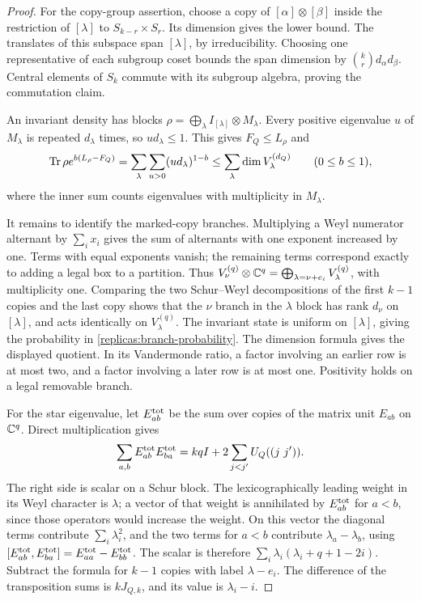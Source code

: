 \begin{proof}
For the copy-group assertion, choose a copy of
$[\alpha]\otimes[\beta]$ inside the restriction of $[\lambda]$ to
$S_{k-r}\times S_r$.  Its dimension gives the lower bound.
The translates of this subspace span $[\lambda]$, by irreducibility.
Choosing one representative of each subgroup coset bounds the span
dimension by $\binom{k}{r}d_\alpha d_\beta$.  Central elements of
$S_k$ commute with its subgroup algebra, proving the commutation claim.

An invariant density has blocks
$\rho=\bigoplus_\lambda I_{[\lambda]}\otimes M_\lambda$.
Every positive eigenvalue $u$ of $M_\lambda$ is repeated $d_\lambda$
times, so $u d_\lambda\le1$.  This gives $F_Q\le L_\rho$ and
\[
 \operatorname{Tr}\rho e^{b(L_\rho-F_Q)}
 =\sum_{\lambda}\sum_{u>0}(u d_\lambda)^{1-b}
 \le\sum_\lambda\dim V^{(d_Q)}_\lambda
 \qquad(0\le b\le1),
\]
where the inner sum counts eigenvalues with multiplicity in
$M_\lambda$.

It remains to identify the marked-copy branches.  Multiplying a Weyl
numerator alternant by $\sum_i x_i$ gives the sum of alternants with
one exponent increased by one.  Terms with equal exponents vanish;
the remaining terms correspond exactly to adding a legal box to a
partition.  Thus
$V^{(q)}_\nu\otimes\mathbb C^q=\bigoplus_{\lambda=\nu+e_i}
V^{(q)}_\lambda$, with multiplicity one.  Comparing the two
Schur--Weyl decompositions of the first $k-1$ copies and the last copy
shows that the $\nu$ branch in the $\lambda$ block has rank
$d_\nu$ on $[\lambda]$, and acts identically on $V^{(q)}_\lambda$.
The invariant state is uniform on $[\lambda]$, giving the probability
in \eqref{replicas:branch-probability}.  The dimension formula gives
the displayed quotient.  In its Vandermonde ratio, a factor involving
an earlier row is at most two, and a factor involving a later row is
at most one.  Positivity holds on a legal removable branch.

For the star eigenvalue, let $E_{ab}^{\rm tot}$ be the sum over copies
of the matrix unit $E_{ab}$ on $\mathbb C^q$.  Direct multiplication gives
\[
 \sum_{a,b}E_{ab}^{\rm tot}E_{ba}^{\rm tot}
 =kq I+2\sum_{j<j'}U_Q((j\ j')).
\]
The right side is scalar on a Schur block.  The lexicographically
leading weight in its Weyl character is $\lambda$; a vector of that
weight is annihilated by $E_{ab}^{\rm tot}$ for $a<b$, since those
operators would increase the weight.  On this vector the diagonal
terms contribute $\sum_i\lambda_i^2$, and the two terms for $a<b$
contribute $\lambda_a-\lambda_b$, using
$[E_{ab}^{\rm tot},E_{ba}^{\rm tot}]=E_{aa}^{\rm tot}-E_{bb}^{\rm tot}$.
The scalar is therefore
$\sum_i\lambda_i(\lambda_i+q+1-2i)$.
Subtract the formula for $k-1$ copies with label $\lambda-e_i$.
The difference of the transposition sums is $kJ_{Q,k}$, and its value
is $\lambda_i-i$.
\end{proof}

